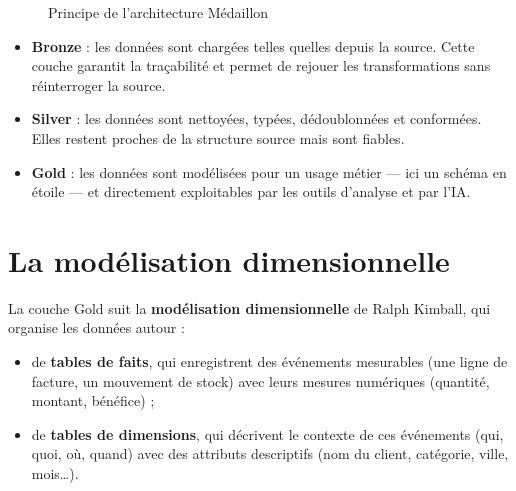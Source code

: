 \begin{figure}[H]
\centering
{}
\caption{Principe de l'architecture Médaillon}
\label{fig:medaillon}
\end{figure}

\begin{itemize}
  \item \textbf{Bronze} : les données sont chargées telles quelles depuis la source. Cette couche
        garantit la traçabilité et permet de rejouer les transformations sans réinterroger la source.
  \item \textbf{Silver} : les données sont nettoyées, typées, dédoublonnées et conformées. Elles restent
        proches de la structure source mais sont fiables.
  \item \textbf{Gold} : les données sont modélisées pour un usage métier --- ici un schéma en étoile ---
        et directement exploitables par les outils d'analyse et par l'IA.
\end{itemize}

\section{La modélisation dimensionnelle}

La couche Gold suit la \textbf{modélisation dimensionnelle} de Ralph Kimball, qui organise les données
autour :
\begin{itemize}
  \item de \textbf{tables de faits}, qui enregistrent des événements mesurables (une ligne de facture,
        un mouvement de stock) avec leurs mesures numériques (quantité, montant, bénéfice) ;
  \item de \textbf{tables de dimensions}, qui décrivent le contexte de ces événements (qui, quoi, où,
        quand) avec des attributs descriptifs (nom du client, catégorie, ville, mois\ldots).
\end{itemize}

